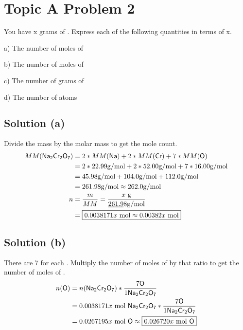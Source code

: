 \documentclass[10pt]{article}
\begin{document}
    \pagebreak
    \section{Topic A Problem 2}
        You have x grams of . 
        Express each of the following quantities in terms of x.

        a) The number of moles of 

        b) The number of moles of 

        c) The number of grams of 

        d) The number of  atoms

        \subsection{Solution (a)}
            Divide the mass by the molar mass to get the mole count.
            \begin{align}
                MM(\ce{Na2Cr2O7})   &=  2 * MM(\ce{Na}) + 2 * MM(\ce{Cr}) + 7 * MM(\ce{O})\\
                    &=  2 * 22.99 \unit{\gram/\mole} + 2 * 52.00 \unit{\gram/\mole} + 7 * 16.00 \unit{\gram/\mole}\\
                    &=  45.98 \unit{\gram/\mole} + 104.0 \unit{\gram/\mole} + 112.0 \unit{\gram/\mole}\\
                    &=  261.98 \unit{\gram/\mole} \approx 262.0 \unit{\gram/\mole}\\
                n   &=  \frac{m}{MM}
                    =   \frac{x\ \unit{\gram}}{\underbar{261.9}8 \unit{\gram/\mole}}\\
                    &=  \boxed{0.0038171x\ \unit{\mole}
                    \approx 0.00382x\ \unit{\mole}}
            \end{align}

        \subsection{Solution (b)}
            There are 7  for each .
            Multiply the number of moles of  by that ratio to get the number of moles of .
            \begin{align}
                n(\ce{O})   &=  n(\ce{Na2Cr2O7}) * \frac{7 \ce{O}}{1 \ce{Na2Cr2O7}}\\
                    &=  0.0038171x\ \unit{\mole}\ \ce{Na2Cr2O7} * \frac{7 \ce{O}}{1 \ce{Na2Cr2O7}}\\
                    &=  0.0267195x\ \unit{\mole}\ \ce{O}
                    \approx \boxed{0.026720x\ \unit{\mole}\ \ce{O}}
            \end{align}
        
\end{document}
